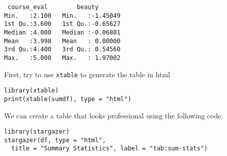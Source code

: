 \documentclass[a4paper,11pt]{article}
\begin{document}
\begin{verbatim}
 course_eval        beauty
Min.   :2.100   Min.   :-1.45049
1st Qu.:3.600   1st Qu.:-0.65627
Median :4.000   Median :-0.06801
Mean   :3.998   Mean   : 0.00000
3rd Qu.:4.400   3rd Qu.: 0.54560
Max.   :5.000   Max.   : 1.97002
\end{verbatim}

First, try to use \texttt{xtable} to generate the table in html
\begin{verbatim}
library(xtable)
print(xtable(sumdf), type = "html")
\end{verbatim}

We can create a table that looks professional using the following
code.
\begin{verbatim}
library(stargazer)
stargazer(df, type = "html",
  title = "Summary Statistics", label = "tab:sum-stats")
\end{verbatim}
\end{document}
